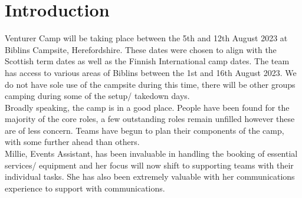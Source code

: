 \chapter{Introduction}

Venturer Camp will be taking place between the 5th and 12th August 2023 at Biblins Campsite, Herefordshire. These dates were chosen to align with the Scottish term dates as well as the Finnish International camp dates. The team has access to various areas of Biblins between the 1st and 16th August 2023. We do not have sole use of the campsite during this time, there will be other groups camping during some of the setup/ takedown days.\\

Broadly speaking, the camp is in a good place. People have been found for the majority of the core roles, a few outstanding roles remain unfilled however these are of less concern. Teams have begun to plan their components of the camp, with some further ahead than others.\\

Millie, Events Assistant, has been invaluable in handling the booking of essential services/ equipment and her focus will now shift to supporting teams with their individual tasks. She has also been extremely valuable with her communications experience to support with communications.